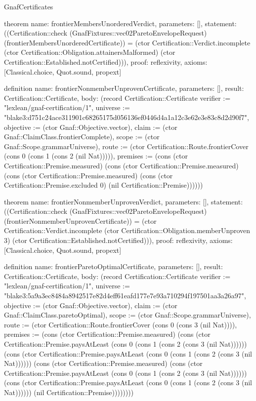 \begin{lexlean}{GnafCertificates}
\begin{semanticmodule}
theorem{
  name: frontierMembersUnorderedVerdict,
  parameters: [],
  statement: ((Certification::check (GnafFixtures::vec02ParetoEnvelopeRequest) (frontierMembersUnorderedCertificate)) = (ctor Certification::Verdict.incomplete (ctor Certification::Obligation.attainersMalformed) (ctor Certification::Established.notCertified))),
  proof: reflexivity{},
  axioms: [Classical.choice, Quot.sound, propext]
}

definition{
  name: frontierNonmemberUnprovenCertificate,
  parameters: [],
  result: Certification::Certificate,
  body: (record Certification::Certificate {verifier := "lexlean/gnaf-certification/1", universe := "blake3:d751c24ace311901c68265175d056136ef0446d4a1a12c3e62e3e83c8d2d90f7", objective := (ctor Gnaf::Objective.vector), claim := (ctor Gnaf::ClaimClass.frontierComplete), scope := (ctor Gnaf::Scope.grammarUniverse), route := (ctor Certification::Route.frontierCover (cons 0 (cons 1 (cons 2 (nil Nat))))), premises := (cons (ctor Certification::Premise.measured) (cons (ctor Certification::Premise.measured) (cons (ctor Certification::Premise.measured) (cons (ctor Certification::Premise.excluded 0) (nil Certification::Premise)))))})
}

theorem{
  name: frontierNonmemberUnprovenVerdict,
  parameters: [],
  statement: ((Certification::check (GnafFixtures::vec02ParetoEnvelopeRequest) (frontierNonmemberUnprovenCertificate)) = (ctor Certification::Verdict.incomplete (ctor Certification::Obligation.memberUnproven 3) (ctor Certification::Established.notCertified))),
  proof: reflexivity{},
  axioms: [Classical.choice, Quot.sound, propext]
}

definition{
  name: frontierParetoOptimalCertificate,
  parameters: [],
  result: Certification::Certificate,
  body: (record Certification::Certificate {verifier := "lexlean/gnaf-certification/1", universe := "blake3:5a9a3ec8484a8942517e82d4eff61eafd177e7e93a710294f197501aa3a26a97", objective := (ctor Gnaf::Objective.vector), claim := (ctor Gnaf::ClaimClass.paretoOptimal), scope := (ctor Gnaf::Scope.grammarUniverse), route := (ctor Certification::Route.frontierCover (cons 0 (cons 3 (nil Nat)))), premises := (cons (ctor Certification::Premise.measured) (cons (ctor Certification::Premise.paysAtLeast (cons 0 (cons 1 (cons 2 (cons 3 (nil Nat)))))) (cons (ctor Certification::Premise.paysAtLeast (cons 0 (cons 1 (cons 2 (cons 3 (nil Nat)))))) (cons (ctor Certification::Premise.measured) (cons (ctor Certification::Premise.paysAtLeast (cons 0 (cons 1 (cons 2 (cons 3 (nil Nat)))))) (cons (ctor Certification::Premise.paysAtLeast (cons 0 (cons 1 (cons 2 (cons 3 (nil Nat)))))) (nil Certification::Premise)))))))})
}


\end{semanticmodule}
\end{lexlean}
